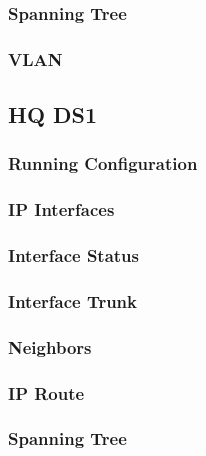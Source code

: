 \subsubsection{Spanning Tree}


\subsubsection{VLAN}






\subsection{HQ DS1}
\subsubsection{Running Configuration}


\subsubsection{IP Interfaces}


\subsubsection{Interface Status}


\subsubsection{Interface Trunk}


\subsubsection{Neighbors}


\subsubsection{IP Route}


\subsubsection{Spanning Tree}


